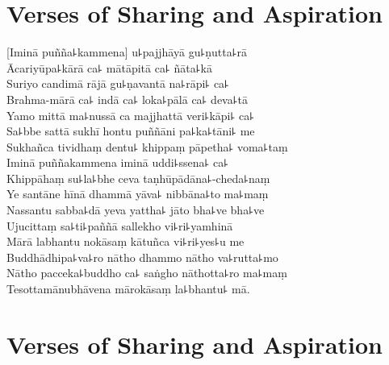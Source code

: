 
\chapter*[Sharing and Aspiration]{Verses of Sharing and Aspiration}%

\delegateSetUseNext

\begin{leader}
\end{leader}


[Iminā puñña꜕kammena] u꜕pajjhāyā gu꜕ṇutta꜕rā\\
Ācariyūpa꜕kārā ca꜕ mātāpitā ca꜕ ñāta꜕kā\\
Suriyo candimā rājā gu꜕ṇavantā na꜕rāpi꜕ ca꜕\\
Brahma-mārā ca꜕ indā ca꜕ loka꜕pālā ca꜕ deva꜕tā\\
Yamo mittā ma꜕nussā ca majjhattā veri꜕kāpi꜕ ca꜕\\
Sa꜕bbe sattā sukhī hontu puññāni pa꜕ka꜕tāni꜕ me\\
Sukhañca tividhaṃ dentu꜕ khippaṃ pāpetha꜕ voma꜕taṃ\\
Iminā puññakammena iminā uddi꜕ssena꜕ ca꜕\\
Khippāhaṃ su꜕la꜕bhe ceva taṇhūpādāna꜕-cheda꜕naṃ\\
Ye santāne hīnā dhammā yāva꜕ nibbāna꜕to ma꜕maṃ\\
Nassantu sabba꜕dā yeva yattha꜕ jāto bha꜕ve bha꜕ve\\
Ujucittaṃ sa꜕ti꜕paññā sallekho vi꜕ri꜕yamhinā\\
Mārā labhantu nokāsaṃ kātuñca vi꜕ri꜕yes꜕u me\\
Buddhādhipa꜕va꜕ro nātho dhammo nātho va꜕rutta꜕mo\\
Nātho pacceka꜕buddho ca꜕ saṅgho nāthotta꜕ro ma꜕maṃ\\
Tesottamānubhāvena mārokāsaṃ la꜕bhantu꜕ mā.

\chapter[Sharing and Aspiration]{Verses of Sharing and Aspiration}%

\begin{leader}
\end{leader}


